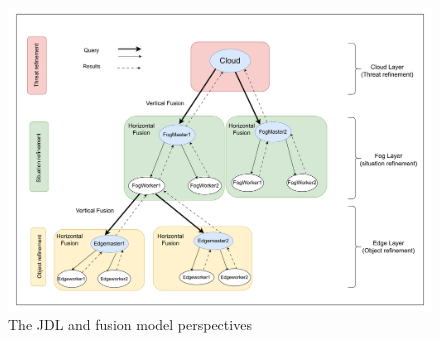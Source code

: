 \documentclass[5p,times]{elsarticle}
\begin{document}



\begin{figure}[t]
    \centering
    \includegraphics[width=\columnwidth]{h3_new.drawio.pdf}
    \caption{The JDL and fusion model perspectives}
    \label{fig:JDLandFusionprespective}
  \end{figure}

  


\end{document}
